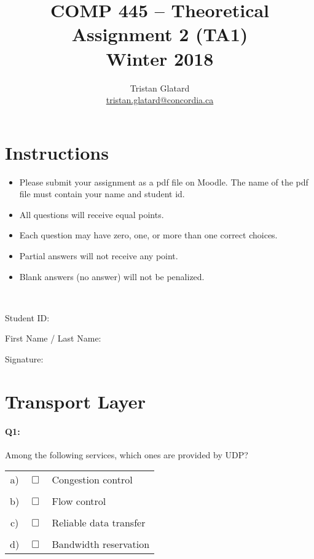 \documentclass{llncs}
\title{COMP 445 -- Theoretical Assignment 2 (TA1)\\ Winter 2018}
\author{Tristan Glatard\\
  \href{mailto:tristan.glatard@concordia.ca}{tristan.glatard@concordia.ca}
}
\institute{Concordia University\\
  Department of Computer Science and Software Engineering}
\newcommand{\myspace}[0]{\vspace*{0.25cm}}
\begin{document}
\maketitle

\section*{Instructions}

\begin{itemize}
\item Please submit your assignment  as a pdf file on Moodle. The name of the pdf file must contain your name and student id. 
\item All questions will receive equal points.
\item Each question may have zero, one, or more than one
  correct choices.
\item Partial answers will not
  receive any point.
\item Blank answers (no answer) will not be penalized.
\end{itemize}

\hrulefill\\

\myspace

\myspace

Student ID: \dotfill

\myspace

\myspace

First Name / Last Name: \dotfill

\myspace

\myspace

Signature: \dotfill

\myspace

\myspace

\hrulefill

\newpage

\section*{Transport Layer}

\paragraph{\textbf{Q1:}}
Among the following services, which ones are provided by UDP?

\begin{tabular}{ccl}
  a) & $\Box$ &  Congestion control\\
  \\
  b) & $\Box$ &  Flow control \\
  \\
  c) & $\Box$ &  Reliable data transfer\\
  \\
  d) & $\Box$ &  Bandwidth reservation
\end{tabular}
\end{document}
